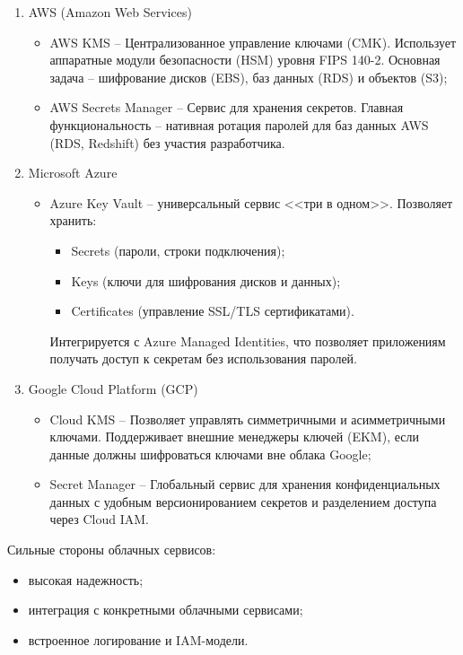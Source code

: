 \documentclass[14pt, a4paper]{extarticle}
\begin{document}
\begin{enumerate}
	\begin{enumerate}[label=\arabic{enumi}.\arabic*), ref=\arabic{enumi}.\arabic*]
	\item AWS (Amazon Web Services)
	\begin{itemize}
	\item AWS KMS -- Централизованное управление ключами (CMK). Использует аппаратные модули безопасности (HSM) уровня FIPS 140-2. Основная задача -- шифрование дисков (EBS), баз данных (RDS) и объектов (S3);
	\item AWS Secrets Manager -- Сервис для хранения секретов. Главная функциональность -- нативная ротация паролей для баз данных AWS (RDS, Redshift) без участия разработчика.
	\end{itemize}
	\item Microsoft Azure
	\begin{itemize}
		\item Azure Key Vault -- универсальный сервис <<три в одном>>. Позволяет хранить:
		\begin{itemize}
		\item Secrets (пароли, строки подключения);
		\item Keys (ключи для шифрования дисков и данных);
		\item Certificates (управление SSL/TLS сертификатами).
		\end{itemize}
		Интегрируется с Azure Managed Identities, что позволяет приложениям получать доступ к секретам без использования паролей.
	\end{itemize}
	\item Google Cloud Platform (GCP)
	\begin{itemize}
	\item Cloud KMS -- Позволяет управлять симметричными и асимметричными ключами. Поддерживает внешние менеджеры ключей (EKM), если данные должны шифроваться ключами вне облака Google;
	\item Secret Manager -- Глобальный сервис для хранения конфиденциальных данных с удобным версионированием секретов и разделением доступа через Cloud IAM.
	\end{itemize}
	\end{enumerate}
	
	Сильные стороны облачных сервисов:
	
	\begin{itemize}
	\item высокая надежность;
	\item интеграция с конкретными облачными сервисами;
	\item встроенное логирование и IAM-модели.
	\end{itemize}
	

\end{enumerate}
\end{document}
